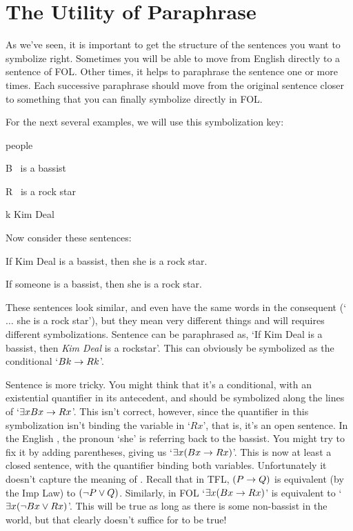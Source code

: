 \section{The Utility of Paraphrase}

As we've seen, it is important to get the structure of the sentences you want to symbolize right. Sometimes you will be able to move from English directly to a sentence of FOL. Other times, it helps to paraphrase the sentence one or more times. Each successive paraphrase should move from the original sentence closer to something that you can finally symbolize directly in FOL.

For the next several examples, we will use this symbolization key:
	\begin{ekey}
		\item[\text{domain}] people
		\item[B] \blank\ is a bassist
		\item[R] \blank\ is a rock star
		\item[k] Kim Deal
	\end{ekey}
Now consider these sentences:
	\begin{earg}
		\item[\ex{pronoun1}] If Kim Deal is a bassist, then she is a rock star.
		\item[\ex{pronoun2}] If someone is a bassist, then she is a rock star.
	\end{earg}
These sentences look similar, and even have the same words in the consequent (`$\ldots$ she is a rock star'), but they mean very different things and will requires different symbolizations. Sentence  can be paraphrased as, `If Kim Deal is a bassist, then \emph{Kim Deal} is a rockstar'. This can obviously be symbolized as the conditional `$Bk \rightarrow Rk$'.


Sentence  is more tricky.  You might think that it's a conditional, with an existential quantifier in its antecedent, and should be symbolized along the lines of `$\exists xBx \rightarrow Rx$'.  This isn't correct, however, since the quantifier in this symbolization isn't binding the variable in `$Rx$', that is, it's an open sentence.  In the English , the pronoun `she' is referring back to the bassist. You might try to fix it by adding parentheses, giving us  `$\exists x(Bx \rightarrow Rx)$'.  This is now at least a closed sentence, with the quantifier binding both variables.  Unfortunately it doesn't capture the meaning of .   Recall that in TFL, $(P \rightarrow Q)$ is equivalent (by the Imp Law) to $(\neg P \vee Q)$.  Similarly, in FOL  `$\exists x(Bx \rightarrow Rx)$' is equivalent to  `$\exists x(\neg Bx \vee Rx)$'.  This will be true as long as there is some non-bassist in the world, but that clearly doesn't suffice for  to be true!


